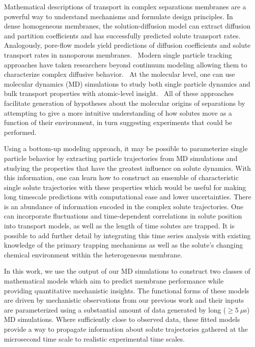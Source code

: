 \documentclass[journal=jctcce,manuscript=article]{achemso}
\begin{document}
  Mathematical descriptions of transport in complex separations membranes are a
  powerful way to understand mechanisms and formulate design principles.
  \cite{vinh-thang_predictive_2013,geens_transport_2006,darvishmanesh_mass_2016}
  In dense homogeneous membranes, the solution-diffusion model
  can extract diffusion and partition coefficients and has successfully
  predicted solute transport rates.~\cite{wijmans_solution-diffusion_1995}
  Analogously, pore-flow models yield predictions of diffusion coefficients and
  solute transport rates in nanoporous membranes.~\cite{paul_diffusive_1974}
  Modern single particle tracking approaches have taken researchers beyond
  continuum modeling allowing them to characterize complex diffusive
  behavior.~\cite{manzo_review_2015} At the molecular level, one can use
  molecular dynamics (MD) simulations to study both single particle dynamics
  and bulk transport properties with atomic-level
  insight.~\cite{coscia_chemically_2019,maginn_best_2018} All of these
  approaches facilitate generation of hypotheses about the molecular origins of
  separations by attempting to give a more intuitive understanding of how
  solutes move as a function of their environment, in turn suggesting
  experiments that could be performed.

  Using a bottom-up modeling approach, it may be possible to parameterize single
  particle behavior by extracting particle trajectories from MD simulations and
  studying the properties that have the greatest influence on solute dynamics.
  With this information, one can learn how to construct an ensemble of characteristic
  single solute trajectories with these properties which would be useful for
  making long timescale predictions with computational ease and lower
  uncertainties. There is an abundance of information encoded in
  the complex solute trajectories. One can incorporate fluctuations and 
  time-dependent correlations in solute position into transport models, 
  as well as the length of time solutes are trapped. It is possible to add further
  detail by integrating this time series analysis with existing knowledge of the
  primary trapping mechanisms as well as the solute's changing chemical environment
  within the heterogeneous membrane. 

  In this work, we use the output of our MD simulations to construct two
  classes of mathematical models which aim to predict membrane performance
  while providing quantitative mechanistic insights. The functional forms of
  these models are driven by mechanistic observations from our previous work and
  their inputs are parameterized using a substantial amount of data generated
  by long ($\geq 5~\mu$s) MD simulations. Where sufficiently close to observed data,
  these fitted models provide a way to propagate information about solute 
  trajectories gathered at the microsecond time scale to realistic experimental 
  time scales. 
\end{document}
